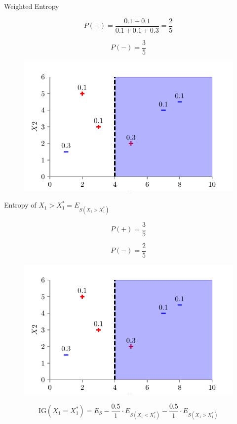 \documentclass[usenames,dvipsnames]{beamer}
\begin{document}
\begin{section}{Weighted Entropy}
\begin{frame}
	$$P(+) = \frac{0.1 + 0.1}{0.1 + 0.1 + 0.3} = \frac{2}{5}$$
	
	$$P(-) = \frac{3}{5}$$
	
	
	\end{frame}
	
	
	\begin{frame}
	
	\begin{figure}
		\centering
		\includegraphics{../assets/decision-trees/figures/dt_weighted/fig5.pdf}
	\end{figure}
	Entropy of $X_1 > X_1^* = E_{S(X_1 > X_1^*)}$
	
	$$P(+) = \frac{3}{5}$$
	
	$$P(-) = \frac{2}{5}$$
	
	\end{frame}
	
	
	
	\begin{frame}
	
	\begin{figure}
		\centering
		\includegraphics{../assets/decision-trees/figures/dt_weighted/fig5.pdf}
	\end{figure}
	
	$$\text{IG}(X_1 = X_1^*) = E_S - \frac{0.5}{1} \cdot E_{S(X_1 < X_1^*)} - \frac{0.5}{1} \cdot E_{S(X_1 > X_1^*)}$$
	
	\end{frame}

\end{section}
\end{document}
